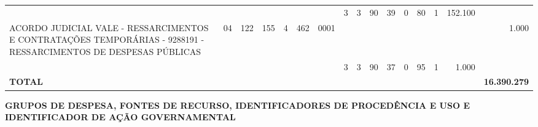 \documentclass{article}
\begin{document}
\begin{longtable}[c]{m{6.5cm}|m{1pt}m{1pt}m{1pt}m{1pt}m{1pt}m{1pt}|m{1pt}m{1pt}m{0.5pt}m{1pt}|m{1pt}|m{1pt}m{1pt}|m{1pt}|m{2pt}}
& & & & & & & \multicolumn{1}{c}{ 3 } & \multicolumn{1}{c}{ 3 } & \multicolumn{1}{c}{ 90 } & \multicolumn{1}{c|}{ 39 } & \multicolumn{1}{c|}{ 0 } & \multicolumn{1}{l}{ 80 } & \multicolumn{1}{c|}{ 1 } & \multicolumn{1}{r|}{ 152.100 } & \\
\multicolumn{1}{L{5.5cm}|}{ ACORDO JUDICIAL VALE - RESSARCIMENTOS E CONTRATAÇÕES TEMPORÁRIAS - 9288191 - RESSARCIMENTOS DE DESPESAS PÚBLICAS } & \multicolumn{1}{c}{ 04 } & \multicolumn{1}{c}{ 122 } & \multicolumn{1}{c}{ 155 } & \multicolumn{1}{l}{ 4 } & \multicolumn{1}{c}{ 462 } & \multicolumn{1}{l|}{ 0001 } & & & & & & & & & \multicolumn{1}{r}{ 1.000 } \\
& & & & & & & \multicolumn{1}{c}{ 3 } & \multicolumn{1}{c}{ 3 } & \multicolumn{1}{c}{ 90 } & \multicolumn{1}{c|}{ 37 } & \multicolumn{1}{c|}{ 0 } & \multicolumn{1}{l}{ 95 } & \multicolumn{1}{c|}{ 1 } & \multicolumn{1}{r|}{ 1.000 } & \\
\hline
\multicolumn{15}{C{6cm}|}{\textbf{ TOTAL }} & \multicolumn{1}{r}{\textbf{ 16.390.279 }} \\
\end{longtable}
\newpage
{}
\ifthispageodd{ }{\afterpage{\null\thispagestyle{empty}\newpage}}
\restoregeometry
\vspace*{9cm}
\centering \Huge {\textbf{GRUPOS DE DESPESA, FONTES DE RECURSO, IDENTIFICADORES DE PROCEDÊNCIA E USO E IDENTIFICADOR DE AÇÃO GOVERNAMENTAL}}
\afterpage{\null\thispagestyle{empty}\newpage}
\newpage
\end{document}

